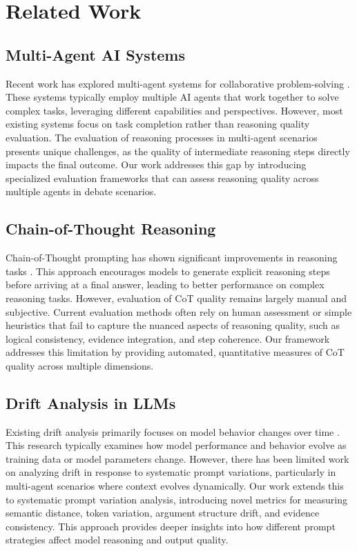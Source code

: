 \documentclass[11pt]{article}
\begin{document}
\section{Related Work}

\subsection{Multi-Agent AI Systems}

Recent work has explored multi-agent systems for collaborative problem-solving \cite{du2023multiagent, chan2024chateval}. These systems typically employ multiple AI agents that work together to solve complex tasks, leveraging different capabilities and perspectives. However, most existing systems focus on task completion rather than reasoning quality evaluation. The evaluation of reasoning processes in multi-agent scenarios presents unique challenges, as the quality of intermediate reasoning steps directly impacts the final outcome. Our work addresses this gap by introducing specialized evaluation frameworks that can assess reasoning quality across multiple agents in debate scenarios.

\subsection{Chain-of-Thought Reasoning}

Chain-of-Thought prompting has shown significant improvements in reasoning tasks \cite{wei2022chain, kojima2022large}. This approach encourages models to generate explicit reasoning steps before arriving at a final answer, leading to better performance on complex reasoning tasks. However, evaluation of CoT quality remains largely manual and subjective. Current evaluation methods often rely on human assessment or simple heuristics that fail to capture the nuanced aspects of reasoning quality, such as logical consistency, evidence integration, and step coherence. Our framework addresses this limitation by providing automated, quantitative measures of CoT quality across multiple dimensions.

\subsection{Drift Analysis in LLMs}

Existing drift analysis primarily focuses on model behavior changes over time \cite{chen2023behavior, li2025drift}. This research typically examines how model performance and behavior evolve as training data or model parameters change. However, there has been limited work on analyzing drift in response to systematic prompt variations, particularly in multi-agent scenarios where context evolves dynamically. Our work extends this to systematic prompt variation analysis, introducing novel metrics for measuring semantic distance, token variation, argument structure drift, and evidence consistency. This approach provides deeper insights into how different prompt strategies affect model reasoning and output quality.
\end{document}
